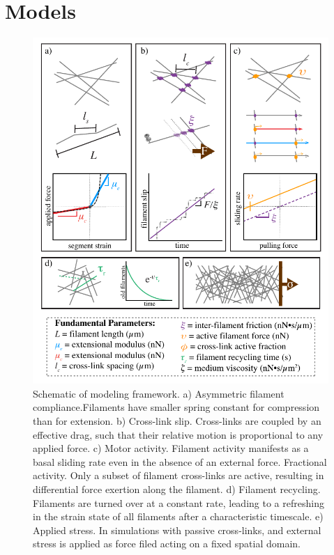 \documentclass[10pt,letterpaper]{article}
\begin{document}
\section*{Models}

\begin{figure}[h!]
\centering
\includegraphics[width=\hsize]{figures/fig2/fig2}
\caption{\label{fig:sim} Schematic of modeling framework. a) Asymmetric filament compliance.Filaments have smaller spring constant for compression than for extension. b) Cross-link slip. Cross-links are coupled by an effective drag, such that their relative motion is
proportional to any applied force. c) Motor activity. Filament activity manifests as a basal sliding rate even in the absence of an external force. Fractional activity. Only a subset of filament cross-links are active, resulting in differential force exertion along the filament. d) Filament recycling. Filaments are turned over at a constant rate, leading to a refreshing in the strain state of all filaments after a characteristic timescale. e) Applied stress. In simulations with passive cross-links, and external stress is applied as force filed acting on a fixed spatial domain.}
\end{figure}
\end{document}
